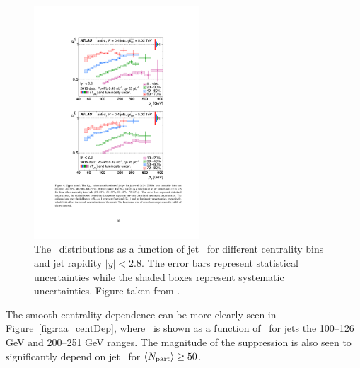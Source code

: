 \begin{figure}[htbp]
\begin{center}
\includegraphics[width=0.55\textwidth]{figures/jetMeasurements/raa}
\caption{The \RAA\ distributions as a function of jet \pt\ for different centrality bins and jet rapidity $|y| < 2.8$.
The error bars represent statistical uncertainties while the shaded boxes represent systematic uncertainties.
Figure taken from \cite{2019108}.}
\label{fig:raa}
\end{center}
\end{figure}

The smooth centrality dependence can be more clearly seen in Figure~\ref{fig:raa_centDep}, where \RAA\ is shown as a function of \ANpart\ for jets the 100--126 GeV and 200--251 GeV ranges.
The magnitude of the suppression is also seen to significantly depend on jet \pt\ for $\mbox{$\langle N_{\mathrm{part}}\rangle$} \geq 50$.


